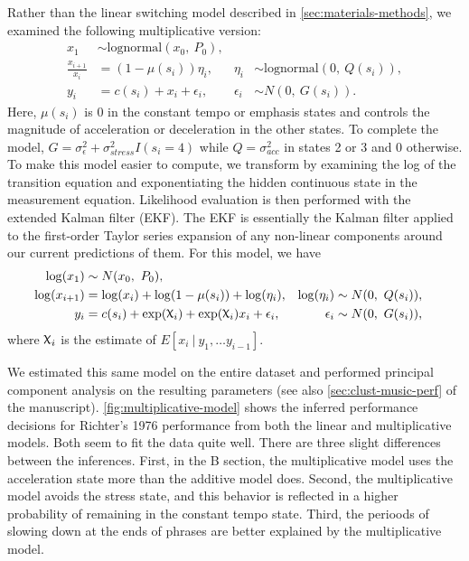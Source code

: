 \documentclass[aoas]{imsart}
\DeclareRobustCommand{\varx}{{\mathpalette\irchi\relax}}
\newcommand{\irchi}[2]{\protect\raisebox{\depth}{$#1\upchi$}}
\newcommand{\given}{\ \vert\ }
\begin{document}
Rather than the linear switching model described in
\autoref{sec:materials-methods}, we examined the following
multiplicative version: \begin{equation}
  \begin{aligned}
    x_1 &\sim \textrm{lognormal}(x_0,\ P_0),\\
    \frac{x_{i+1}}{x_i} &= (1-\mu(s_i)) \eta_i, 
    & \eta_i &\sim \textrm{lognormal}(0,\ Q(s_i)),\\
    y_i&= c(s_i) +x_i + \epsilon_i, & \epsilon_i &\sim N(0,\ G(s_i)).
  \end{aligned}
\end{equation} Here, \(\mu(s_i)\) is 0 in the constant tempo or emphasis
states and controls the magnitude of acceleration or deceleration in the
other states. To complete the model,
\(G=\sigma^2_\epsilon + \sigma^2_{stress}I(s_i=4)\) while
\(Q = \sigma^2_{acc}\) in states 2 or 3 and 0 otherwise. To make this
model easier to compute, we transform by examining the log of the
transition equation and exponentiating the hidden continuous state in
the measurement equation. Likelihood evaluation is then performed with
the extended Kalman filter (EKF). The EKF is essentially the Kalman
filter applied to the first-order Taylor series expansion of any
non-linear components around our current predictions of them. For this
model, we have \begin{equation}
  \begin{aligned}
    \log(x_1) &\sim N(x_0,\ P_0),\\
    \log(x_{i+1}) &= \log(x_i) + \log(1-\mu(s_i)) + \log(\eta_i), 
    & \log(\eta_i) &\sim N(0,\ Q(s_i)),\\
    y_i&= c(s_i) +\exp(\varx_i) + \exp(\varx_i)x_i + \epsilon_i, & \epsilon_i &\sim N(0,\ G(s_i)),
  \end{aligned}
\end{equation} where \(\varx_i\) is the estimate of
\(E\left[x_i \given y_1,\ldots y_{i-1}\right]\).

We estimated this same model on the entire dataset and performed
principal component analysis on the resulting parameters (see also
\autoref{sec:clust-music-perf} of the manuscript).
\autoref{fig:multiplicative-model} shows the inferred performance
decisions for Richter's 1976 performance from both the linear and
multiplicative models. Both seem to fit the data quite well. There are
three slight differences between the inferences. First, in the B
section, the multiplicative model uses the acceleration state more than
the additive model does. Second, the multiplicative model avoids the
stress state, and this behavior is reflected in a higher probability of
remaining in the constant tempo state. Third, the perioods of slowing
down at the ends of phrases are better explained by the multiplicative
model.
\end{document}
